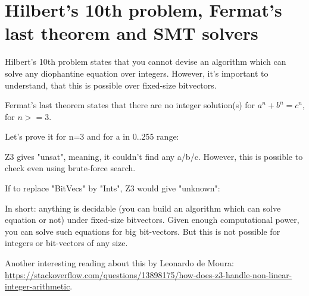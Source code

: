 \section{Hilbert's 10th problem, Fermat’s last theorem and SMT solvers}

\renewcommand{\CURPATH}{other/Hilbert_10}

Hilbert's 10th problem states that you cannot devise an algorithm which can solve any diophantine equation over integers.
However, it's important to understand, that this is possible over fixed-size bitvectors.

Fermat's last theorem states that there are no integer solution(s) for $a^n + b^n = c^n$, for $n>=3$.

Let's prove it for n=3 and for a in 0..255 range:



Z3 gives "unsat", meaning, it couldn't find any a/b/c.
However, this is possible to check even using brute-force search.

If to replace "BitVecs" by "Ints", Z3 would give "unknown":



In short: anything is decidable (you can build an algorithm which can solve equation or not) under fixed-size bitvectors.
Given enough computational power, you can solve such equations for big bit-vectors.
But this is not possible for integers or bit-vectors of any size.

Another interesting reading about this by Leonardo de Moura:
\url{https://stackoverflow.com/questions/13898175/how-does-z3-handle-non-linear-integer-arithmetic}.

